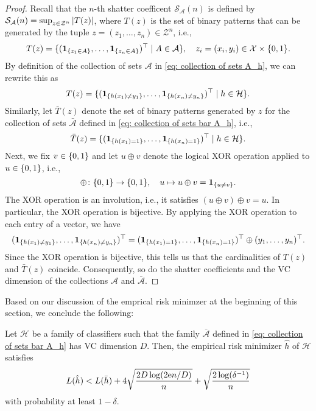\begin{proof}
Recall that the $n$-th shatter coefficent $\mathcal{S}_{\mathcal{A}}(n)$ is defined by $\mathcal{S}_{\mathcal{A}}(n) = \sup_{z \in \mathcal{Z}^n} \abs{T(z)}$, where $T(z)$ is the set of binary patterns that can be generated by the tuple $z = (z_1, \dots, z_n) \in \mathcal{Z}^n$, i.e.,
\[
    T(z) = \{(\indSet{z_1 \in A}, \dots, \indSet{z_n \in A})^{\top} \with A \in \mathcal{A}\}, \quad z_i = (x_i, y_i) \in \mathcal{X} \times \set{0, 1}.
\]
By definition of the collection of sets $\mathcal{A}$ in \eqref{eq: collection of sets A_h}, we can rewrite this as
\[
    T(z) = \{(\indSet{h(x_1) \neq y_1}, \dots, \indSet{h(x_n) \neq y_n})^{\top} \with h \in \mathcal{H}\}.
\]
Similarly, let $\bar{T}(z)$ denote the set of binary patterns generated by $z$ for the collection of sets $\bar{\mathcal{A}}$ defined in \eqref{eq: collection of sets bar A_h}, i.e.,
\[
    \bar{T}(z) = \{(\indSet{h(x_1) = 1}, \dots, \indSet{h(x_n) = 1})^{\top} \with h \in \mathcal{H}\}.
\]
Next, we fix $v \in \set{0, 1}$ and let $u \oplus v$ denote the logical XOR operation applied to $u \in \set{0, 1}$, i.e.,
\[
    \oplus \colon \set{0, 1} \to \set{0, 1}, \quad u \mapsto u \oplus v = \indSet{u \neq v}.
\]
The XOR operation is an involution, i.e., it satisfies $(u \oplus v) \oplus v = u$. In particular, the XOR operation is bijective. By applying the XOR operation to each entry of a vector, we have
\[
    (\indSet{h(x_1) \neq y_1}, \dots, \indSet{h(x_n) \neq y_n})^{\top} = (\indSet{h(x_1) = 1}, \dots, \indSet{h(x_n) = 1})^{\top} \oplus (y_1, \dots, y_n)^{\top}.
\]
Since the XOR operation is bijective, this tells us that the cardinalities of $T(z)$ and $\bar{T}(z)$ coincide. Consequently, so do the shatter coefficients and the VC dimension of the collections $\mathcal{A}$ and $\bar{\mathcal{A}}$.
\end{proof}

Based on our discussion of the emprical risk minimzer at the beginning of this section, we conclude the following:

\begin{corollary}
Let $\mathcal{H}$ be a family of classifiers such that the family $\bar{\mathcal{A}}$ defined in \eqref{eq: collection of sets bar A_h} has VC dimension $D$. Then, the empirical risk minimizer $\hat{h}$ of $\mathcal{H}$ satisfies
\[
    L(\hat{h}) < L(\bar{h}) + 4 \sqrt{\frac{2D \log(2 \mathrm{e} n / D)}{n}} + \sqrt{\frac{2 \log(\delta^{-1})}{n}}
\]
with probability at least $1 - \delta$.
\end{corollary}
